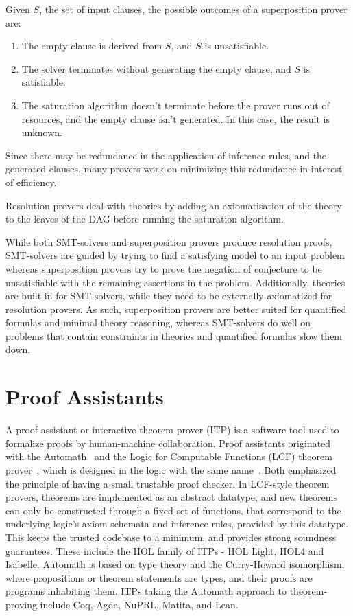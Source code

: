\documentclass{article}
\begin{document}
	Given $S$, the set of input clauses, the possible 
	outcomes of a superposition prover are:
	\begin{enumerate}
		\item The empty clause is derived from $S$, and
		$S$ is unsatisfiable.
		\item The solver terminates without generating the 
		empty clause, and $S$ is satisfiable.
		\item The saturation algorithm doesn't terminate 
		before the prover runs out of resources, and 
		the empty clause isn't generated. In this 
		case, the result is unknown. 
	\end{enumerate}
	
	Since there may be redundance in the application 
	of inference rules, and the generated clauses, 
	many provers work on minimizing this redundance in 
	interest of efficiency.
	
	Resolution provers deal with theories by 
	adding an axiomatisation of the theory to the 
	leaves of the DAG before running the 
	saturation algorithm.
	
	While both SMT-solvers and superposition provers 
	produce resolution proofs, SMT-solvers are guided 
	by trying to find a satisfying model to an input 
	problem whereas superposition provers try 
	to prove the negation of conjecture to be unsatisfiable
	with the remaining assertions in the problem. 
	Additionally, theories are built-in for SMT-solvers,
	while they need to be externally axiomatized for 
	resolution provers. As such, superposition provers
	are better suited for quantified formulas and 
	minimal theory reasoning, whereas SMT-solvers 
	do well on problems that contain constraints 
	in theories and quantified formulas slow them 
	down.
	
\section{Proof Assistants}
\label{sec:itp}
	A proof assistant or interactive theorem prover 
	(ITP) is a software tool used to formalize
	proofs by human-machine collaboration.
	Proof assistants originated with the 
	Automath~\cite{10.1007/BFb0060623} and 
	the Logic for Computable Functions (LCF) 
	theorem prover~\cite{10.5555/891954}, 
	which is designed in the logic with the 
	same name~\cite{Loeckx1987}. Both emphasized the 
	principle of having a small trustable proof 
	checker. In LCF-style theorem provers, theorems 
	are implemented as an abstract datatype, and 
	new theorems can only be constructed through a 
	fixed set of functions, that correspond to the 
	underlying logic's axiom schemata and inference 
	rules, provided by this datatype. This keeps
	the trusted codebase to a minimum, and 
	provides strong soundness guarantees. These 
	include the HOL family of ITPs - HOL Light, 
	HOL4 and Isabelle. Automath is based on type 
	theory and the Curry-Howard isomorphism, where 
	propositions or theorem statements are types, 
	and their proofs are programs inhabiting them. 
	ITPs taking the Automath approach to 
	theorem-proving include Coq, Agda, NuPRL, 
	Matita, and Lean.
	
\end{document}
